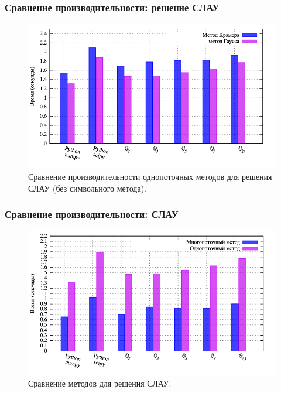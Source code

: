 \documentclass[10pt,professionalfont,utf8,presentation,compress]{beamer}
\theoremstyle{definition}
\theoremstyle{plain}
\begin{document}
\begin{frame}
\frametitle{Сравнение производительности: решение СЛАУ}
\begin{figure}[H]
\centerline{\includegraphics[width=0.95\linewidth]{../gnuplot/single/system/wosymb.png}}
\caption{Сравнение производительности однопоточных методов для решения СЛАУ (без символьного метода).}
\label{img:single:system:2}
\end{figure}
\end{frame}

\begin{frame}
\frametitle{Сравнение производительности: СЛАУ}
\begin{figure}[H]
\centerline{\includegraphics[width=0.95\linewidth]{../gnuplot/multi/gauss/plot.png}}
\caption{Сравнение методов для решения СЛАУ.}
\label{img:multi:gauss}
\end{figure}
\end{frame}
\end{document}
